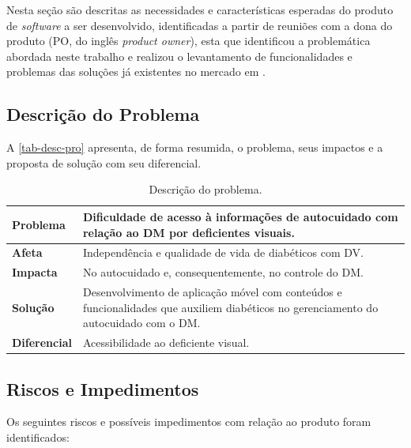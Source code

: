 Nesta seção são descritas as necessidades e características esperadas do produto de \emph{software} a ser desenvolvido, identificadas a partir de
reuniões com a dona do produto (PO, do inglês \emph{product owner}), esta que identificou a problemática abordada neste trabalho e
realizou o levantamento de funcionalidades e problemas das soluções já existentes no mercado em .

\subsection{Descrição do Problema}

A \autoref{tab-desc-pro} apresenta, de forma resumida, o problema, seus impactos e a proposta de solução com seu diferencial.

\begin{table}[htb]
    \caption{Descrição do problema.}
    \label{tab-desc-pro}
    \begin{center}
        \begin{tabular}{p{4.0cm}|p{10.0cm}}
            \textbf{Problema}    & Dificuldade de acesso à informações de autocuidado com relação ao DM por deficientes visuais.                                          \\
            \hline
            \textbf{Afeta}       & Independência e qualidade de vida de diabéticos com DV\@.                                                                              \\
            \hline
            \textbf{Impacta}     & No autocuidado e, consequentemente, no controle do DM\@.                                                                               \\
            \hline
            \textbf{Solução}     & Desenvolvimento de aplicação móvel com conteúdos e funcionalidades que auxiliem diabéticos no gerenciamento do autocuidado com o DM\@. \\
            \hline
            \textbf{Diferencial} & Acessibilidade ao deficiente visual.
        \end{tabular}
    \end{center}
\end{table}

\subsection{Riscos e Impedimentos}

Os seguintes riscos e possíveis impedimentos com relação ao produto foram identificados:


